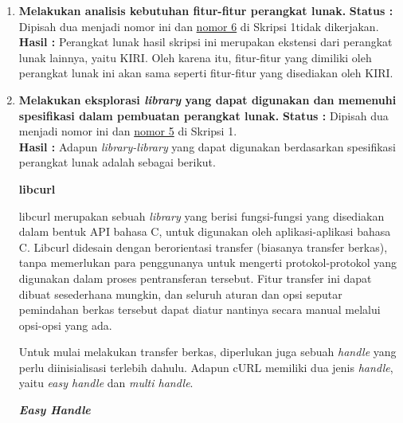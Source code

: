 \documentclass[a4paper,twoside]{article}
\begin{document}
\begin{enumerate}
\begin{itemize}
\end{itemize}
		
		\item \textbf{Melakukan analisis kebutuhan fitur-fitur perangkat lunak.}		
		\label{sec:num5} \newline
		{\bf Status :} Dipisah dua menjadi nomor ini dan \hyperref[sec:num6]{nomor 6} di Skripsi 1\textemdash tidak dikerjakan.\\
		{\bf Hasil :} Perangkat lunak hasil skripsi ini merupakan ekstensi dari perangkat lunak lainnya, yaitu KIRI. Oleh karena itu, fitur-fitur yang dimiliki oleh perangkat lunak ini akan sama seperti fitur-fitur yang disediakan oleh KIRI.
		
		
		\item \textbf{Melakukan eksplorasi \textit{library} yang dapat digunakan dan memenuhi spesifikasi dalam pembuatan perangkat lunak.}
		\label{sec:num6} \newline
		{\bf Status :} Dipisah dua menjadi nomor ini dan \hyperref[sec:num5]{nomor 5} di Skripsi 1.\\
		{\bf Hasil :} Adapun \textit{library-library} yang dapat digunakan berdasarkan spesifikasi perangkat lunak adalah sebagai berikut.

\textbf{\large{libcurl} \cite{stenberg:2022:everythingcurl}}
\label{sec:cmodules-libcurl}

libcurl merupakan sebuah \textit{library} yang berisi fungsi-fungsi yang disediakan dalam bentuk API bahasa C, untuk digunakan oleh aplikasi-aplikasi bahasa C. Libcurl didesain dengan berorientasi transfer (biasanya transfer berkas), tanpa memerlukan para penggunanya untuk mengerti protokol-protokol yang digunakan dalam proses pentransferan tersebut. Fitur transfer ini dapat dibuat sesederhana mungkin, dan seluruh aturan dan opsi seputar pemindahan berkas tersebut dapat diatur nantinya secara manual melalui opsi-opsi yang ada.

Untuk mulai melakukan transfer berkas, diperlukan juga sebuah \textit{handle} yang perlu diinisialisasi terlebih dahulu. Adapun cURL memiliki dua jenis \textit{handle}, yaitu \textit{easy handle} dan \textit{multi handle}. 

\vspace{\baselineskip}
\textbf{\textit{Easy Handle}}
\label{sec:cmodules-libcurl-handleeasy}


\end{enumerate}
\end{document}
